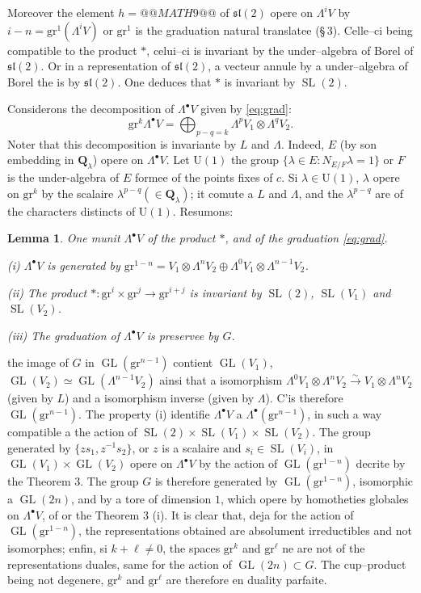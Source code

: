 \documentclass[11pt,a4paper]{article}
\theoremstyle{plain}
\newtheorem{lemma}[theorem]{Lemma}
\theoremstyle{definition}
\DeclareMathOperator{\SL}{SL}
\DeclareMathOperator{\GL}{GL}
\begin{document}
Moreover the element $h = @@MATH9@@$ of $\mathfrak{sl}(2)$ opere on $\Lambda^i V$ by $i - n = \mathrm{gr}^1(\Lambda^i V)$ or $\mathrm{gr}^1$ is the graduation natural translatee (\S\,3). Celle--ci being compatible to the product $*$, celui--ci is invariant by the under--algebra of Borel of $\mathfrak{sl}(2)$. Or in a representation of $\mathfrak{sl}(2)$, a vecteur annule by a under--algebra of Borel the is by $\mathfrak{sl}(2)$. One deduces that $*$ is invariant by $\SL(2)$.

Considerons the decomposition of $\Lambda^\bullet V$ given by \eqref{eq:grad}:
\[
\mathrm{gr}^k \Lambda^\bullet V = \bigoplus_{p-q=k} \Lambda^p V_1 \otimes \Lambda^q V_2 .
\]
Noter that this decomposition is invariante by $L$ and $\Lambda$. Indeed, $E$ (by son embedding in $\mathbf{Q}_\lambda$) opere on $\Lambda^\bullet V$. Let $\mathrm{U}(1)$ the group $\{\lambda \in E : N_{E/F} \lambda = 1\}$ or $F$ is the under-algebra of $E$ formee of the points fixes of $c$. Si $\lambda \in \mathrm{U}(1)$, $\lambda$ opere on $\mathrm{gr}^k$ by the scalaire $\lambda^{p-q} (\in \mathbf{Q}_\lambda)$; it comute a $L$ and $\Lambda$, and the $\lambda^{p-q}$ are of the characters distincts of $\mathrm{U}(1)$. Resumons:

\begin{lemma}\label{lem:4.1}
One munit $\Lambda^\bullet V$ of the product $*$, and of the graduation \eqref{eq:grad}.

\emph{(i)} $\Lambda^\bullet V$ is generated by $\mathrm{gr}^{1-n} = V_1 \otimes \Lambda^n V_2 \oplus \Lambda^0 V_1 \otimes \Lambda^{n-1} V_2$.

\emph{(ii)} The product $* : \mathrm{gr}^i \times \mathrm{gr}^j \to \mathrm{gr}^{i+j}$ is invariant by $\SL(2)$, $\SL(V_1)$ and $\SL(V_2)$.

\emph{(iii)} The graduation of $\Lambda^\bullet V$ is preservee by $G$.
\end{lemma}

the image of $G$ in $\GL(\mathrm{gr}^{n-1})$ contient $\GL(V_1)$, $\GL(V_2) \simeq \GL(\Lambda^{n-1} V_2)$ ainsi that a isomorphism $\Lambda^0 V_1 \otimes \Lambda^n V_2 \xrightarrow{\sim} V_1 \otimes \Lambda^n V_2$ (given by $L$) and a isomorphism inverse (given by $\Lambda$). C'is therefore $\GL(\mathrm{gr}^{n-1})$. The property (i) identifie $\Lambda^\bullet V$ a $\Lambda^\bullet(\mathrm{gr}^{n-1})$, in such a way compatible a the action of $\SL(2) \times \SL(V_1) \times \SL(V_2)$. The group generated by $\{zs_1, z^{-1}s_2\}$, or $z$ is a scalaire and $s_i \in \SL(V_i)$, in $\GL(V_1) \times \GL(V_2)$ opere on $\Lambda^\bullet V$ by the action of $\GL(\mathrm{gr}^{1-n})$ decrite by the Theorem 3. The group $G$ is therefore generated by $\GL(\mathrm{gr}^{1-n})$, isomorphic a $\GL(2n)$, and by a tore of dimension $1$, which opere by homotheties globales on $\Lambda^\bullet V$, of or the Theorem 3 (i). It is clear that, deja for the action of $\GL(\mathrm{gr}^{1-n})$, the representations obtained are absolument irreductibles and not isomorphes; enfin, si $k + \ell \neq 0$, the spaces $\mathrm{gr}^k$ and $\mathrm{gr}^\ell$ ne are not of the representations duales, same for the action of $\GL(2n) \subset G$. The cup--product being not degenere, $\mathrm{gr}^k$ and $\mathrm{gr}^\ell$ are therefore en duality parfaite.
\end{document}
